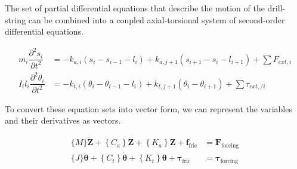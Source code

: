 The set of partial differential equations that describe the motion of the drill-string can be combined into a coupled axial-torsional system of second-order differential equations.

\begin{align}\label{Governing equations}
     m_{i}\dfrac{\partial^{2}s_{i}}{\partial t^{2}} & = -k_{a,i}(s_{i}-s_{i-1}-l_{i}) + k_{a,j+1}(s_{i+1}-s_{i}-l_{i+1}) + \sum{F_{ext, i}} \\
     I_{i}l_{i}\dfrac{\partial^{2}\theta_{i}}{\partial t^{2}} & = -k_{t,i}(\theta_{i}-\theta_{i-1}-l_{i}) + k_{t,j+1}(\theta_{i}-\theta_{i+1}) + \sum{\tau_{ext,/ i}}
\end{align}

To convert these equation sets into vector form, we can represent the variables and their derivatives as vectors.

\begin{align}
  \{M\} \ddot{\boldsymbol{Z}}+\left\{C_a\right\} \dot{\boldsymbol{Z}}+\left\{K_a\right\} \boldsymbol{Z}+\boldsymbol{f}_{\text{fric}} &= \boldsymbol{F}_{\text{forcing}} \label{eq:em_axial_vector_form}\\
  \{J\} \ddot{\boldsymbol{\theta}}+\left\{C_t\right\} \dot{\boldsymbol{\theta}}+\left\{K_t\right\} \boldsymbol{\theta}+\boldsymbol{\tau}_{\text{fric}} &= \boldsymbol{\tau}_{\text{forcing}} \label{eq:em_torsional_vector_form}
\end{align}



